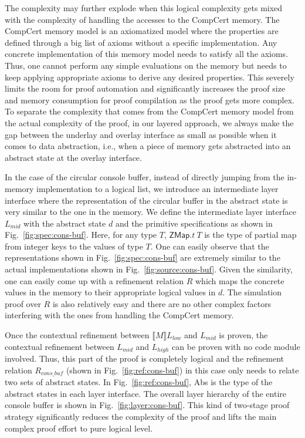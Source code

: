 The complexity may further explode when this logical complexity gets mixed with
the complexity of handling the accesses to the CompCert memory. The CompCert memory
model is an axiomatized model where the properties are defined through a big
list of axioms without a specific implementation. Any concrete implementation of
this memory model needs to satisfy all the axioms. Thus, one cannot perform any
simple evaluations on the memory but needs to keep applying appropriate axioms
to derive any desired properties. This severely limits the room for proof
automation and significantly increases the proof size and memory consumption for
proof compilation as the proof gets more complex. To separate the complexity
that comes from the CompCert memory model from the actual complexity of the
proof, in our layered approach, we always make the gap between the underlay and
overlay interface as small as possible when it comes to data abstraction, i.e.,
when a piece of memory gets abstracted into an abstract state at the overlay
interface.

In the case of the circular console buffer, instead of directly jumping from
the in-memory implementation to a logical list, we introduce an intermediate
layer interface where the representation of the circular buffer in the abstract
state is very similar to the one in the memory. We define the intermediate
layer interface $L_{mid}$ with the abstract state $d$ and the primitive specifications
as shown in Fig.~\ref{fig:spec:cons-buf}. Here, for any type $T$, $\mathsf{ZMap}.t~T$
is the type of partial map from integer keys to the values of type $T$.
One can easily observe that the representations shown in Fig.~\ref{fig:spec:cons-buf} are
extremely similar to the actual implementations shown in Fig.~\ref{fig:source:cons-buf}.
Given the similarity, one can easily come up with a refinement relation $R$ which
maps the concrete values in the memory to their appropriate logical values in $d$.
The simulation proof over $R$ is also relatively easy and there are no other
complex factors interfering with the ones from handling the CompCert memory.

Once the contextual refinement between $\llbracket{}M\rrbracket{}L_{low}$ and
$L_{mid}$ is proven, the contextual refinement between $L_{mid}$ and $L_{high}$
can be proven with no code module involved. Thus, this part of the proof is completely
logical and the refinement relation $R_{cons\_buf}$ (shown in Fig.~\ref{fig:ref:cons-buf})
in this case only needs to relate two sets of abstract states.
In Fig.~\ref{fig:ref:cons-buf}, \textsf{Abs} is the type of the abstract states
in each layer interface.
The overall layer hierarchy of the entire console buffer is shown in Fig.~\ref{fig:layer:cons-buf}.
This kind of two-stage proof strategy
significantly reduces the complexity
of the proof and lifts the main complex proof effort to pure logical level.

